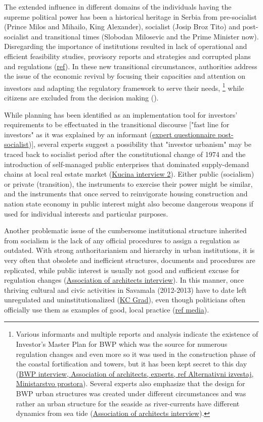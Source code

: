 \documentclass[11pt]{report}
\begin{document}
\begin{itemize}
The extended influence in different domains of the individuals having the supreme political power has been a historical heritage in Serbia from pre-socialist (Prince Milos and Mihailo, King Alexander), socialist (Josip Broz Tito) and post-socialist and transitional times (Slobodan Milosevic and the Prime Minister now).
Disregarding the importance of institutions resulted in lack of operational and efficient feasibility studies, provisory reports and strategies and corrupted plans and regulations (\href{}{ref}).
In these new transitional circumstances, authorities address the issue of the economic revival by focusing their capacities and attention on investors and adapting the regulatory framework to serve their needs,
\footnote{Various informants and multiple reports and analysis indicate the existence of Investor's Master Plan for BWP which was the source for numerous regulation changes and even more so it was used in the construction phase of the coastal fortification and towers, but it has been kept secret to this day (\href{}{BWP interview, Association of architects, experts, ref Alternativni izvestaj, Ministarstvo prostora}).
Several experts also emphasize that the design for BWP urban structures was created under different circumstances and was rather an urban structure for the seaside as river-currents have different dynamics from sea tide (\href{}{Association of architects interview}).}
while citizens are excluded from the decision making (\cite{Urbani razvoj u Srbiji Ministry of Space 2014}).

While planning has been identified as an implementation tool for investors' requirements to be effectuated in the transitional discourse ["fast line for investors" as it was explained by an informant (\href{}{expert questionnaire post-socialist})],
several experts suggest a possibility that "investor urbanism" may be traced back to socialist period after the constitutional change of 1974 and the introduction of self-managed public enterprises that dominated supply-demand chains at local real estate market (\href{}{Kucina interview 2}).
Either public (socialism) or private (transition), the instruments to exercise their power might be similar, and the instruments that once served to reinvigorate housing construction and nation state economy in public interest might also become dangerous weapons if used for individual interests and particular purposes.

Another problematic issue of the cumbersome institutional structure inherited from socialism is the lack of any official procedures to assign a regulation as outdated.
With strong authoritarianism and hierarchy in urban institutions, it is very often that obsolete and inefficient structures, documents and procedures are replicated, while public interest is usually not good and sufficient excuse for regulation changes (\href{}{Association of architects interview}).
In this manner, once thriving cultural and civic activities in Savamala (2012-2013) have to date left unregulated and uninstitutionalized (\href{}{KC Grad}), even though politicians often officially use them as examples of good, local practice (\href{}{ref media}).
\\


\end{itemize}
\end{document}
